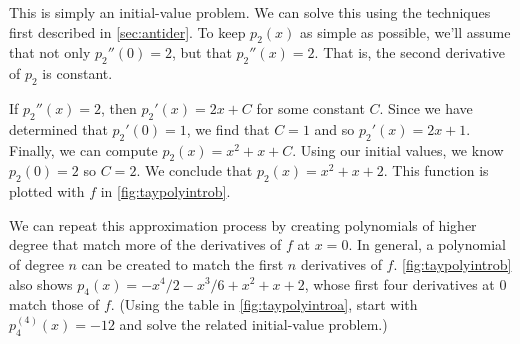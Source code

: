 This is simply an initial-value problem. We can solve this using the techniques first described in \autoref{sec:antider}. To keep $p_2(x)$ as simple as possible, we'll assume that not only  $p_2''(0)=2$, but that $p_2''(x)=2$. That is, the second derivative of $p_2$ is  constant.


If $p_2''(x) = 2$, then $p_2'(x) = 2x+C$ for some constant $C$. Since we have determined that $p_2'(0) = 1$, we find that $C=1$ and so $p_2'(x) = 2x+1$. Finally, we can compute $p_2(x) = x^2+x+C$. Using our initial values, we know $p_2(0) = 2$ so $C=2.$ We conclude that $p_2(x) = x^2+x+2.$ This function is plotted with $f$ in \autoref{fig:taypolyintrob}.

We can repeat this approximation process by creating polynomials of higher degree that match more of the derivatives of $f$ at $x=0$. In general, a polynomial of degree $n$ can be created to match the first $n$ derivatives of $f$. \autoref{fig:taypolyintrob} also shows $p_4(x)= -x^4/2-x^3/6+x^2+x+2$, whose first four derivatives at 0 match those of $f$. (Using the table in \autoref{fig:taypolyintroa}, start with $p_4^{(4)}(x)=-12$ and solve the related initial-value problem.)

